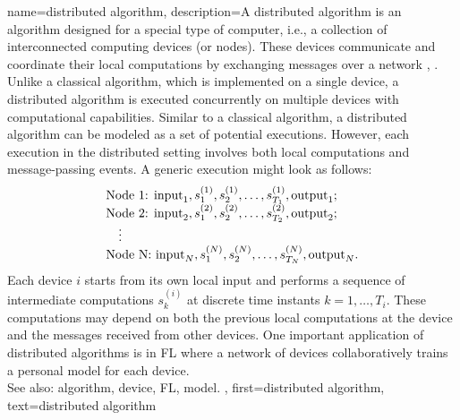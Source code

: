 {name={distributed algorithm},
	description={A distributed algorithm is an algorithm designed for 
		a special type of computer, i.e., a collection of interconnected computing devices (or nodes). 
		These devices communicate and coordinate their local computations by exchanging 
		messages over a network \cite{IntroDistAlg}, \cite{ParallelDistrBook}. Unlike a classical algorithm, 
		which is implemented on a single device, a distributed algorithm is 
		executed concurrently on multiple devices with computational capabilities. 
		Similar to a classical algorithm, a distributed algorithm can be modeled as a 
		set of potential executions. However, each execution in the distributed setting involves 
		both local computations and message-passing events. A generic execution might look as 
		follows:
		\[
		\begin{array}{l}
			\text{Node 1: } {\rm input}_1, s_1^{(1)}, s_2^{(1)}, \ldots, s_{T_1}^{(1)}, {\rm output}_1; \\
			\text{Node 2: } {\rm input}_2, s_1^{(2)}, s_2^{(2)}, \ldots, s_{T_2}^{(2)}, {\rm output}_2; \\
			\quad \vdots \\
			\text{Node N: } {\rm input}_N, s_1^{(N)}, s_2^{(N)}, \ldots, s_{T_N}^{(N)}, {\rm output}_N.
		\end{array}
		\]
		Each device $i$ starts from its own local input and performs a sequence of 
		intermediate computations $s_{k}^{(i)}$ at discrete time instants $k = 1, \dots, T_i$. 
		These computations may depend on both the previous local computations at the device 
		and the messages received from other devices. One important application of distributed 
		algorithms is in FL where a network of devices collaboratively trains a personal model 
		for each device. 
					\\ 
		See also: algorithm, device, FL, model.
		},
	first={distributed algorithm}, text={distributed algorithm}
}


